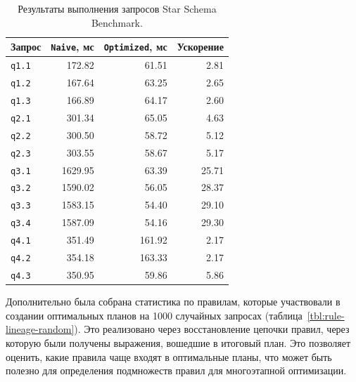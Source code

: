 \documentclass[14pt, russian]{scrartcl}
\begin{document}
\begin{table}[H]
  \centering
  \caption{Результаты выполнения запросов Star Schema Benchmark.}
  \label{tbl:ssb-benchmark}
  \begin{tabular}{|l|r|r|r|}
    \hline
    Запрос & \texttt{Naive}, мс & \texttt{Optimized}, мс & Ускорение \\
    \hline
    \texttt{q1.1} & 172.82 & 61.51 & 2.81 \\
    \texttt{q1.2} & 167.64 & 63.25 & 2.65 \\
    \texttt{q1.3} & 166.89 & 64.17 & 2.60 \\
    \texttt{q2.1} & 301.34 & 65.05 & 4.63 \\
    \texttt{q2.2} & 300.50 & 58.72 & 5.12 \\
    \texttt{q2.3} & 303.55 & 58.67 & 5.17 \\
    \texttt{q3.1} & 1629.95 & 63.39 & 25.71 \\
    \texttt{q3.2} & 1590.02 & 56.05 & 28.37 \\
    \texttt{q3.3} & 1583.15 & 54.40 & 29.10 \\
    \texttt{q3.4} & 1587.09 & 54.16 & 29.30 \\
    \texttt{q4.1} & 351.49 & 161.92 & 2.17 \\
    \texttt{q4.2} & 354.18 & 163.33 & 2.17 \\
    \texttt{q4.3} & 350.95 & 59.86 & 5.86 \\
    \hline
  \end{tabular}
\end{table}

Дополнительно была собрана статистика по правилам, которые участвовали в
создании оптимальных планов на 1000 случайных запросах
(таблица~\ref{tbl:rule-lineage-random}). Это реализовано через восстановление
цепочки правил, через которую были получены выражения, вошедшие в итоговый план.
Это позволяет оценить, какие правила чаще входят в оптимальные планы, что может
быть полезно для определения подмножеств правил для многоэтапной оптимизации.
\end{document}
